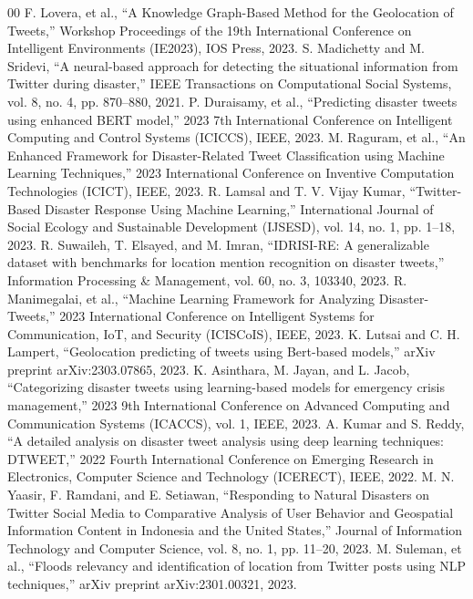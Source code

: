\documentclass[conference]{IEEEtran}
\begin{document}
\begin{thebibliography}{00}
\footnotesize
{} F. Lovera, et al., ``A Knowledge Graph-Based Method for the Geolocation of Tweets,'' Workshop Proceedings of the 19th International Conference on Intelligent Environments (IE2023), IOS Press, 2023.
 S. Madichetty and M. Sridevi, ``A neural-based approach for detecting the situational information from Twitter during disaster,'' IEEE Transactions on Computational Social Systems, vol. 8, no. 4, pp. 870--880, 2021.
 P. Duraisamy, et al., ``Predicting disaster tweets using enhanced BERT model,'' 2023 7th International Conference on Intelligent Computing and Control Systems (ICICCS), IEEE, 2023.
 M. Raguram, et al., ``An Enhanced Framework for Disaster-Related Tweet Classification using Machine Learning Techniques,'' 2023 International Conference on Inventive Computation Technologies (ICICT), IEEE, 2023.
 R. Lamsal and T. V. Vijay Kumar, ``Twitter-Based Disaster Response Using Machine Learning,'' International Journal of Social Ecology and Sustainable Development (IJSESD), vol. 14, no. 1, pp. 1--18, 2023.
 R. Suwaileh, T. Elsayed, and M. Imran, ``IDRISI-RE: A generalizable dataset with benchmarks for location mention recognition on disaster tweets,'' Information Processing \& Management, vol. 60, no. 3, 103340, 2023.
 R. Manimegalai, et al., ``Machine Learning Framework for Analyzing Disaster-Tweets,'' 2023 International Conference on Intelligent Systems for Communication, IoT, and Security (ICISCoIS), IEEE, 2023.
 K. Lutsai and C. H. Lampert, ``Geolocation predicting of tweets using Bert-based models,'' arXiv preprint arXiv:2303.07865, 2023.
 K. Asinthara, M. Jayan, and L. Jacob, ``Categorizing disaster tweets using learning-based models for emergency crisis management,'' 2023 9th International Conference on Advanced Computing and Communication Systems (ICACCS), vol. 1, IEEE, 2023.
 A. Kumar and S. Reddy, ``A detailed analysis on disaster tweet analysis using deep learning techniques: DTWEET,'' 2022 Fourth International Conference on Emerging Research in Electronics, Computer Science and Technology (ICERECT), IEEE, 2022.
 M. N. Yaasir, F. Ramdani, and E. Setiawan, ``Responding to Natural Disasters on Twitter Social Media to Comparative Analysis of User Behavior and Geospatial Information Content in Indonesia and the United States,'' Journal of Information Technology and Computer Science, vol. 8, no. 1, pp. 11--20, 2023.
 M. Suleman, et al., ``Floods relevancy and identification of location from Twitter posts using NLP techniques,'' arXiv preprint arXiv:2301.00321, 2023.

\end{thebibliography}
\end{document}
